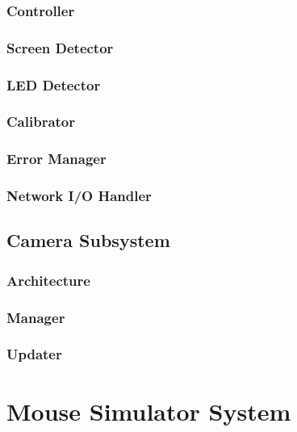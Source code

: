 \documentclass[11pt,a4paper,oldfontcommands]{memoir}
\begin{document}
\subsubsection{Controller}

\subsubsection{Screen Detector}

\subsubsection{LED Detector}

\subsubsection{Calibrator}

\subsubsection{Error Manager}

\subsubsection{Network I/O Handler}

\newpage

\subsection{Camera Subsystem}

\subsubsection{Architecture}

\subsubsection{Manager}

\subsubsection{Updater}

\newpage

\section{Mouse Simulator System}
\end{document}
